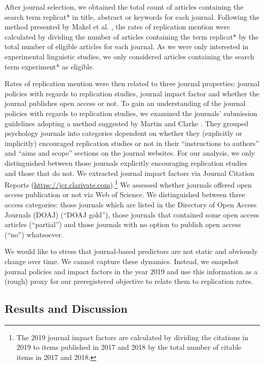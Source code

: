 \documentclass[cm,linguex]{glossa}
\begin{document}
After journal selection, we obtained the total count of articles containing the search term replicat* in title, abstract or keywords for each journal.
Following the method presented by Makel et al. \citeyearpar{makel_replications_2012}, the rates of replication mention were calculated by dividing the number of articles containing the term replicat* by the total number of eligible articles for each journal. As we were only interested in experimental linguistic studies, we only considered articles containing the search term experiment* as eligible.

Rates of replication mention were then related to three journal properties: journal policies with regards to replication studies, journal impact factor and whether the journal publishes open access or not.
To gain an understanding of the journal policies with regards to replication studies, we examined the journals' submission guidelines adopting a method suggested by Martin and Clarke \citeyearpar{martin_are_2017}.
They grouped psychology journals into categories dependent on whether they (explicitly or implicitly) encouraged replication studies or not in their ``instructions to authors'' and ``aims and scope'' sections on the journal websites. For our analysis, we only distinguished between those journals explicitly encouraging replication studies and those that do not.
We extracted journal impact factors via Journal Citation Reports (\url{https://jcr.clarivate.com}).\footnote{The 2019 journal impact factors are calculated by dividing the citations in 2019 to items published in 2017 and 2018 by the total number of citable items in 2017 and 2018.}
We assessed whether journals offered open access publication or not via Web of Science.
We distinguished between three access categories: those journals which are listed in the Directory of Open Access Journals (DOAJ) (``DOAJ gold''), those journals that contained some open access articles (``partial'') and those journals with no option to publish open access (``no'') whatsoever.

We would like to stress that journal-based predictors are not static and obviously change over time. We cannot capture these dynamics. Instead, we snapshot journal policies and impact factors in the year 2019 and use this information as a (rough) proxy for our preregistered objective to relate them to replication rates.

\hypertarget{results-and-discussion}{%
\subsection{Results and Discussion}\label{results-and-discussion}}
\end{document}
